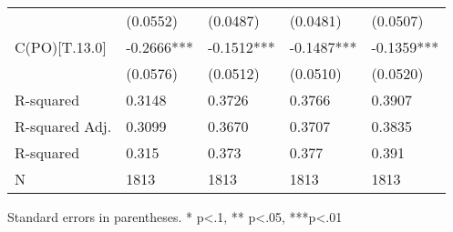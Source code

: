 \begin{table}
\begin{center}
\begin{tabular}{lllll}
                         & (0.0552)   & (0.0487)   & (0.0481)   & (0.0507)    \\
C(PO)[T.13.0]            & -0.2666*** & -0.1512*** & -0.1487*** & -0.1359***  \\
                         & (0.0576)   & (0.0512)   & (0.0510)   & (0.0520)    \\
R-squared                & 0.3148     & 0.3726     & 0.3766     & 0.3907      \\
R-squared Adj.           & 0.3099     & 0.3670     & 0.3707     & 0.3835      \\
R-squared                & 0.315      & 0.373      & 0.377      & 0.391       \\
N                        & 1813       & 1813       & 1813       & 1813        \\
\hline
\end{tabular}
\end{center}
\end{table}
\bigskip
Standard errors in parentheses. \newline 
* p<.1, ** p<.05, ***p<.01